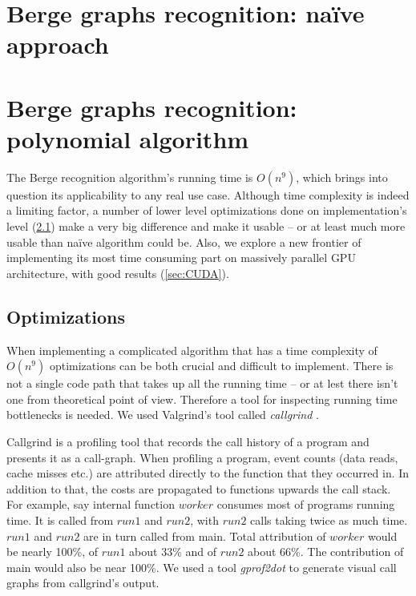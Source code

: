 
\section{Berge graphs recognition: na\"ive approach}

\section{Berge graphs recognition: polynomial algorithm}

The Berge recognition algorithm's running time is $O(n^9)$, which brings into question its applicability to any real use case. Although time complexity is indeed a limiting factor, a number of lower level optimizations done on implementation's level (\cref{sec:Optimizations}) make a very big difference and make it usable -- or at least much more usable than na\"ive algorithm could be. Also, we explore a new frontier of implementing its most time consuming part on massively parallel GPU architecture, with good results (\cref{sec:CUDA}).


\subsection{Optimizations}
\label{sec:Optimizations}

When implementing a complicated algorithm that has a time complexity of $O(n^9)$ optimizations can be both crucial and difficult to implement. There is not a single code path that takes up all the running time -- or at lest there isn't one from theoretical point of view. Therefore a tool for inspecting running time bottlenecks is needed. We used Valgrind's tool called \emph{callgrind} \cite{callgrind}.

Callgrind is a profiling tool that records the call history of a program and presents it as a call-graph. When profiling a program, event counts (data reads, cache misses etc.) are attributed directly to the function that they occurred in. In addition to that, the costs are propagated to functions upwards the call stack. For example, say internal function $worker$ consumes most of programs running time. It is called from $run1$ and $run2$, with $run2$ calls taking twice as much time. $run1$ and $run2$ are in turn called from main. Total attribution of $worker$ would be nearly 100\%, of $run1$ about 33\% and of $run2$ about 66\%. The contribution of main would also be near 100\%. We used a tool \emph{gprof2dot} \cite{gprof2dot} to generate visual call graphs from callgrind's output.

